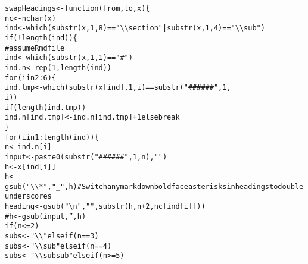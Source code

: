 \documentclass{article}\usepackage[]{graphicx}\usepackage[]{color}
\makeatletter
\newcommand{\hlnum}[1]{\textcolor[rgb]{0.863,0.196,0.184}{#1}}%
\newcommand{\hlstr}[1]{\textcolor[rgb]{0.863,0.196,0.184}{#1}}%
\newcommand{\hlcom}[1]{\textcolor[rgb]{0.345,0.431,0.459}{#1}}%
\newcommand{\hlopt}[1]{\textcolor[rgb]{0.576,0.631,0.631}{#1}}%
\newcommand{\hlstd}[1]{\textcolor[rgb]{0.514,0.58,0.588}{#1}}%
\newcommand{\hlkwa}[1]{\textcolor[rgb]{0.796,0.294,0.086}{#1}}%
\newcommand{\hlkwb}[1]{\textcolor[rgb]{0.522,0.6,0}{#1}}%
\newcommand{\hlkwc}[1]{\textcolor[rgb]{0.796,0.294,0.086}{#1}}%
\newcommand{\hlkwd}[1]{\textcolor[rgb]{0.576,0.631,0.631}{#1}}%
\newenvironment{kframe}{%
 \def\at@end@of@kframe{}%
 \ifinner\ifhmode%
  \def\at@end@of@kframe{\end{minipage}}%
  \begin{minipage}{\columnwidth}%
 \fi\fi%
 \def\FrameCommand##1{\hskip\@totalleftmargin \hskip-\fboxsep
 \colorbox{shadecolor}{##1}\hskip-\fboxsep
     \hskip-\linewidth \hskip-\@totalleftmargin \hskip\columnwidth}%
 \MakeFramed {\advance\hsize-\width
   \@totalleftmargin\z@ \linewidth\hsize
   \@setminipage}}%
 {\par\unskip\endMakeFramed%
 \at@end@of@kframe}
\newenvironment{knitrout}{}{} %
\makeatother
\begin{document}
\begin{knitrout}
\begin{kframe}
\begin{alltt}
    \hlstd{swapHeadings} \hlkwb{<-} \hlkwa{function}\hlstd{(}\hlkwc{from}\hlstd{,} \hlkwc{to}\hlstd{,} \hlkwc{x}\hlstd{) \{}
        \hlstd{nc} \hlkwb{<-} \hlkwd{nchar}\hlstd{(x)}
        \hlstd{ind} \hlkwb{<-} \hlkwd{which}\hlstd{(}\hlkwd{substr}\hlstd{(x,} \hlnum{1}\hlstd{,} \hlnum{8}\hlstd{)} \hlopt{==} \hlstr{"\textbackslash{}\textbackslash{}section"} \hlopt{|} \hlkwd{substr}\hlstd{(x,} \hlnum{1}\hlstd{,} \hlnum{4}\hlstd{)} \hlopt{==} \hlstr{"\textbackslash{}\textbackslash{}sub"}\hlstd{)}
        \hlkwa{if} \hlstd{(}\hlopt{!}\hlkwd{length}\hlstd{(ind)) \{}
            \hlcom{# assume Rmd file}
            \hlstd{ind} \hlkwb{<-} \hlkwd{which}\hlstd{(}\hlkwd{substr}\hlstd{(x,} \hlnum{1}\hlstd{,} \hlnum{1}\hlstd{)} \hlopt{==} \hlstr{"#"}\hlstd{)}
            \hlstd{ind.n} \hlkwb{<-} \hlkwd{rep}\hlstd{(}\hlnum{1}\hlstd{,} \hlkwd{length}\hlstd{(ind))}
            \hlkwa{for} \hlstd{(i} \hlkwa{in} \hlnum{2}\hlopt{:}\hlnum{6}\hlstd{) \{}
                \hlstd{ind.tmp} \hlkwb{<-} \hlkwd{which}\hlstd{(}\hlkwd{substr}\hlstd{(x[ind],} \hlnum{1}\hlstd{, i)} \hlopt{==} \hlkwd{substr}\hlstd{(}\hlstr{"######"}\hlstd{,} \hlnum{1}\hlstd{,}
                  \hlstd{i))}
                \hlkwa{if} \hlstd{(}\hlkwd{length}\hlstd{(ind.tmp))}
                  \hlstd{ind.n[ind.tmp]} \hlkwb{<-} \hlstd{ind.n[ind.tmp]} \hlopt{+} \hlnum{1} \hlkwa{else break}
            \hlstd{\}}
            \hlkwa{for} \hlstd{(i} \hlkwa{in} \hlnum{1}\hlopt{:}\hlkwd{length}\hlstd{(ind)) \{}
                \hlstd{n} \hlkwb{<-} \hlstd{ind.n[i]}
                \hlstd{input} \hlkwb{<-} \hlkwd{paste0}\hlstd{(}\hlkwd{substr}\hlstd{(}\hlstr{"######"}\hlstd{,} \hlnum{1}\hlstd{, n),} \hlstr{" "}\hlstd{)}
                \hlstd{h} \hlkwb{<-} \hlstd{x[ind[i]]}
                \hlstd{h} \hlkwb{<-} \hlkwd{gsub}\hlstd{(}\hlstr{"\textbackslash{}\textbackslash{}*"}\hlstd{,} \hlstr{"_"}\hlstd{, h)}  \hlcom{# Switch any markdown boldface asterisks in headings to double underscores}
                \hlstd{heading} \hlkwb{<-} \hlkwd{gsub}\hlstd{(}\hlstr{"\textbackslash{}n"}\hlstd{,} \hlstr{""}\hlstd{,} \hlkwd{substr}\hlstd{(h, n} \hlopt{+} \hlnum{2}\hlstd{, nc[ind[i]]))}
                \hlcom{# h <- gsub(input, '', h)}
                \hlkwa{if} \hlstd{(n} \hlopt{<=} \hlnum{2}\hlstd{)}
                  \hlstd{subs} \hlkwb{<-} \hlstr{"\textbackslash{}\textbackslash{}"} \hlkwa{else if} \hlstd{(n} \hlopt{==} \hlnum{3}\hlstd{)}
                  \hlstd{subs} \hlkwb{<-} \hlstr{"\textbackslash{}\textbackslash{}sub"} \hlkwa{else if} \hlstd{(n} \hlopt{==} \hlnum{4}\hlstd{)}
                  \hlstd{subs} \hlkwb{<-} \hlstr{"\textbackslash{}\textbackslash{}subsub"} \hlkwa{else if} \hlstd{(n} \hlopt{>=} \hlnum{5}\hlstd{)}

\end{alltt}
\end{kframe}
\end{knitrout}
\end{document}
